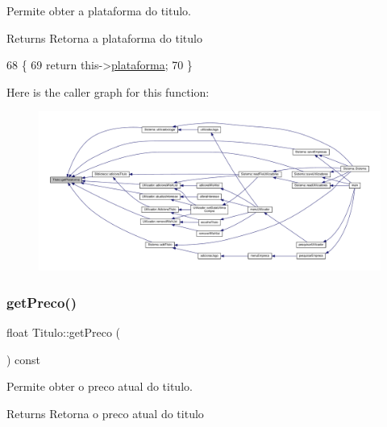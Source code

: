 Permite obter a plataforma do titulo. 

\begin{DoxyReturn}{Returns}
Retorna a plataforma do titulo 
\end{DoxyReturn}

\begin{DoxyCode}
68                                       \{
69      \textcolor{keywordflow}{return} this->\hyperlink{classTitulo_a67761eb7f006453ab0869e4b7c0a9c0b}{plataforma};
70  \}
\end{DoxyCode}
Here is the caller graph for this function\+:
\nopagebreak
\begin{figure}[H]
\begin{center}
\leavevmode
\includegraphics[width=350pt]{classTitulo_a2a57a31d40c5df012b3c6e2451c253dd_icgraph}
\end{center}
\end{figure}
\mbox{\label{classTitulo_a93725bdc2e98350e47b54fd76c0fa236}} 
\subsubsection{\texorpdfstring{get\+Preco()}{getPreco()}}
{\footnotesize\ttfamily float Titulo\+::get\+Preco (\begin{DoxyParamCaption}{ }\end{DoxyParamCaption}) const}



Permite obter o preco atual do titulo. 

\begin{DoxyReturn}{Returns}
Retorna o preco atual do titulo 
\end{DoxyReturn}

